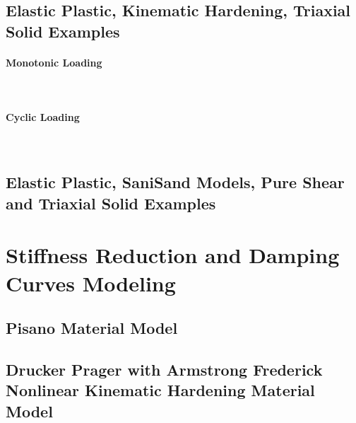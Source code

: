 \documentclass[fleqn,11pt]{article}
\begin{document}
\subsection{Elastic Plastic, Kinematic Hardening, Triaxial Solid Examples}

\paragraph{Monotonic Loading} ~


\paragraph{Cyclic Loading} ~






\subsection{Elastic  Plastic, SaniSand Models,  Pure Shear and Triaxial Solid Examples}




\section{Stiffness Reduction and Damping Curves Modeling}

\subsection{Pisano Material Model}


\subsection{Drucker Prager with Armstrong Frederick
            Nonlinear Kinematic Hardening
            Material Model}
\end{document}
